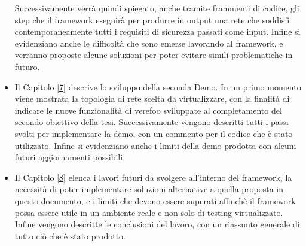 \begin{itemize}
          Successivamente verrà quindi spiegato, anche tramite frammenti di codice, gli step
          che il framework eseguirà per produrre in output una rete che soddisfi contemporaneamente tutti i requisiti di sicurezza passati come input.  
          Infine si evidenziano anche le difficoltà che sono emerse lavorando al framework, e verranno proposte alcune soluzioni per poter evitare simili problematiche in futuro.
    \item Il Capitolo \hyperref[ch:intro]{[7]} descrive lo sviluppo della seconda Demo. In un primo momento viene mostrata la topologia
        di rete scelta da virtualizzare, con la finalità di indicare le nuove funzionalità di verefoo sviluppate al completamento del secondo obiettivo della tesi. Successivamente vengono descritti tutti i passi svolti per implementare la demo, con un commento per il codice che è stato utilizzato. Infine
        si evidenziano anche i limiti della demo prodotta con alcuni  futuri aggiornamenti possibili.
    \item Il Capitolo \hyperref[ch:conclusions]{[8]} elenca i lavori futuri da svolgere all'interno del framework, la necessità di poter implementare soluzioni
          alternative a quella proposta in questo documento, e i limiti che devono essere superati affinchè il framework possa essere utile in un ambiente reale e non
          solo di testing virtualizzato. Infine vengono descritte le conclusioni del lavoro, con un riassunto generale di tutto ciò che è stato prodotto.
\end{itemize}